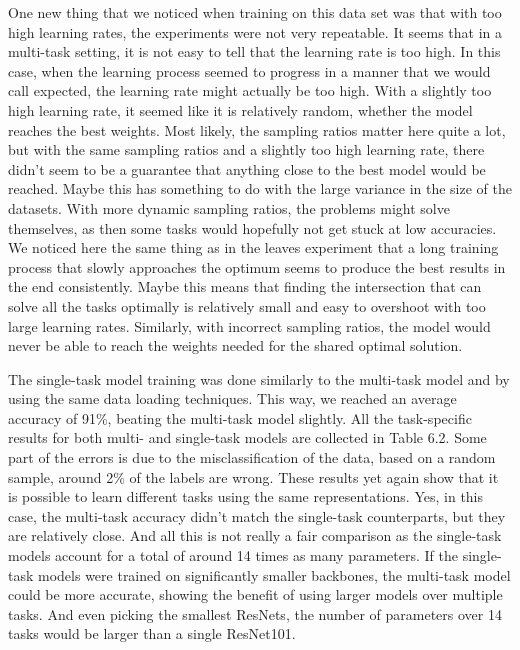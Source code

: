 One new thing that we noticed when training on this data set was that with too high learning rates, the experiments were not very repeatable.
It seems that in a multi-task setting, it is not easy to tell that the learning rate is too high.
In this case, when the learning process seemed to progress in a manner that we would call expected, the learning rate might actually be too high.
With a slightly too high learning rate, it seemed like it is relatively random, whether the model reaches the best weights.
Most likely, the sampling ratios matter here quite a lot, but with the same sampling ratios and a slightly too high learning rate, there didn't seem to be a guarantee that anything close to the best model would be reached.
Maybe this has something to do with the large variance in the size of the datasets.
With more dynamic sampling ratios, the problems might solve themselves, as then some tasks would hopefully not get stuck at low accuracies.
We noticed here the same thing as in the leaves experiment that a long training process that slowly approaches the optimum seems to produce the best results in the end consistently.
Maybe this means that finding the intersection that can solve all the tasks optimally is relatively small and easy to overshoot with too large learning rates.
Similarly, with incorrect sampling ratios, the model would never be able to reach the weights needed for the shared optimal solution.

The single-task model training was done similarly to the multi-task model and by using the same data loading techniques.
This way, we reached an average accuracy of 91\%, beating the multi-task model slightly.
All the task-specific results for both multi- and single-task models are collected in Table 6.2.
Some part of the errors is due to the misclassification of the data, based on a random sample, around 2\% of the labels are wrong.
These results yet again show that it is possible to learn different tasks using the same representations.
Yes, in this case, the multi-task accuracy didn't match the single-task counterparts, but they are relatively close.
And all this is not really a fair comparison as the single-task models account for a total of around 14 times as many parameters.
If the single-task models were trained on significantly smaller backbones, the multi-task model could be more accurate, showing the benefit of using larger models over multiple tasks.
And even picking the smallest ResNets, the number of parameters over 14 tasks would be larger than a single ResNet101.

